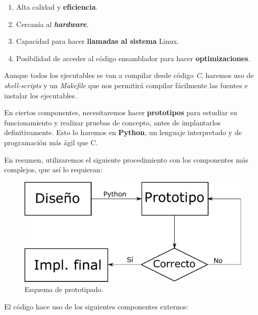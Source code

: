 \begin{enumerate}
	\item Alta calidad y \textbf{eficiencia}.
	\item Cercanía al \textbf{\textit{hardware}}.
	\item Capacidad para hacer \textbf{llamadas al sistema} Linux.
	\item Posibilidad de acceder al código ensamblador para hacer \textbf{optimizaciones}.
\end{enumerate}

Aunque todos los ejecutables se van a compilar desde código \textit{C}, haremos uso de \textit{shell-scripts} y un \textit{Makefile} que nos permitirá compilar fácilmente las fuentes e instalar los ejecutables.

En ciertos componentes, necesitaremos hacer \textbf{prototipos} para estudiar su funcionamiento y realizar pruebas de concepto, antes de implantarlos definitivamente. Esto lo haremos en \textbf{Python}, un lenguaje interpretado y de programación más ágil que C.

En resumen, utilizaremos el siguiente procedimiento con los componentes más complejos, que así lo requieran:

\smallskip

\begin{figure}[H]
	\noindent \begin{centering}
		\includegraphics[width=\linewidth/2]{capitulo5/prototipado}
		\par\end{centering}
	\smallskip
	\caption{\label{fig:prototipado} Esquema de prototipado.}
\end{figure} 

\smallskip

El código hace uso de los siguientes componentes externos:

